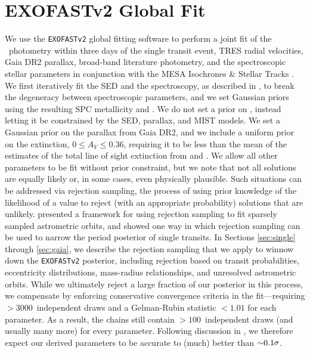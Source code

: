 \documentclass[twocolumn]{aastex63}
\begin{document}
\section{EXOFAST\lowercase{v}2 Global Fit} 
\label{sec:exofast}

We use the \texttt{EXOFASTv2} global fitting software \citep{Eastman:2017,eastman:2019} to perform a joint fit of the \kep\ photometry within three days of the single transit event, TRES radial velocities, Gaia DR2 parallax, broad-band literature photometry, and the spectroscopic stellar parameters in conjunction with the MESA Isochrones \& Stellar Tracks \citep[MIST;][]{paxton:2011,dotter:2016,choi:2016}. We first iteratively fit the SED and the spectroscopy, as described in , to break the degeneracy between spectroscopic parameters, and we set Gaussian priors using the resulting SPC metallicity and \teff. We do not set a prior on \logg, instead letting it be constrained by the SED, parallax, and MIST models. We set a Gaussian prior on the parallax from Gaia DR2, and we include a uniform prior on the extinction, $0 \leq A_V \leq 0.36$, requiring it to be less than the mean of the estimates of the total line of sight extinction from \citet{schlafly:2011} and \cite{Schlegel:1998}. We allow all other parameters to be fit without prior constraint, but we note that not all solutions are equally likely or, in some cases, even physically plausible. Such situations can be addressed via rejection sampling, the process of using prior knowledge of the likelihood of a value to reject (with an appropriate probability) solutions that are unlikely. \citet{blunt:2017} presented a framework for using rejection sampling to fit sparsely sampled astrometric orbits, and \citet{vanderburg:2018} showed one way in which rejection sampling can be used to narrow the period posterior of single transits. In Sections \ref{sec:single} through \ref{sec:gaia}, we describe the rejection sampling that we apply to winnow down the \texttt{EXOFASTv2} posterior, including rejection based on transit probabilities, eccentricity distributions, mass-radius relationships, and unresolved astrometric orbits. While we ultimately reject a large fraction of our posterior in this process, we compensate by enforcing conservative convergence criteria in the fit---requiring $>3000$\ independent draws and a Gelman-Rubin statistic $<1.01$ for each parameter. As a result, the chains still contain $>100$\ independent draws (and usually many more) for every parameter. Following discussion in \citet{eastman:2019}, we therefore expect our derived parameters to be accurate to (much) better than $\mathord{\sim}0.1\sigma$.
\end{document}
